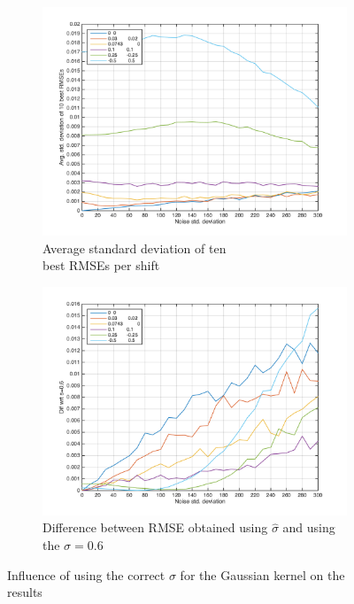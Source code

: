 \begin{figure}[!ht]
	\centering
	\begin{subfigure}{0.45\textwidth}
		\includegraphics[width=\textwidth]{Results/avgStdOf10BestByShiftAndNoise}
		\caption{Average standard deviation of ten\\ best RMSEs per shift}
		\label{fig:avgStdDevOf10Best}
	\end{subfigure}
	\begin{subfigure}{0.45\textwidth}
		 \includegraphics[width=1\textwidth]{Results/DifWith06ByShiftAndNoise}
		 \caption{Difference between RMSE obtained using $\hat{\sigma}$ and using the $\sigma=0.6$}
		 \label{fig:difWith06}
	\end{subfigure}
	\caption{Influence of using the correct $\sigma$ for the Gaussian kernel on the results}
	\label{fig:InfluenceOfSigmaByNoiseAndShift}
\end{figure}


